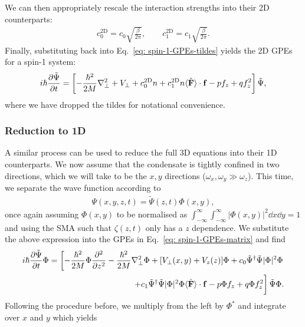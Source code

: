 We can then appropriately rescale the interaction strengths into their 2D
counterparts:
\begin{align}
    c_0^\text{2D} = c_0\sqrt{\frac{\beta}{2\pi}}, \qquad
    c_1^\text{2D} = c_1\sqrt{\frac{\beta}{2\pi}}.
\end{align}
Finally, substituting back into Eq.~\eqref{eq: spin-1-GPEs-tildes} yields the
2D GPEs for a spin-1 system:
\begin{align}
    i\hbar\pdv{\tilde{\Psi}}{t} = \left[-\frac{\hbar^2}{2M}\nabla_\perp^2 + V_\perp
    + c_0^\text{2D}n + c_1^\text{2D}n\langle\hat{\vb{F}}\rangle \cdot
    \vb{f} - pf_z + qf_z^2\right]\tilde{\Psi},
\end{align}
where we have dropped the tildes for notational convenience.

\subsubsection{Reduction to 1D}
A similar process can be used to reduce the full 3D equations into their 1D
counterparts.
We now assume that the condensate is tightly confined in two directions, which
we will take to be the \(x, y\) directions (\(\omega_x, \omega_y \gg
\omega_z\)).
This time, we separate the wave function according to
\begin{align}
    \Psi(x, y, z, t) = \tilde{\Psi}(z, t)\Phi(x, y),
\end{align}
once again assuming \(\Phi(x, y)\) to be normalised as \(\int_{-\infty}^{\infty}
\int_{-\infty}^{\infty} |\Phi(x, y)|^2 \dd x \dd y = 1\) and using the SMA such
that \(\zeta(z, t)\) only has a \(z\) dependence.
We substitute the above expression into the GPEs in
Eq.~\eqref{eq: spin-1-GPEs-matrix} and find
\begin{equation}
\begin{split}
    i\hbar\pdv{\tilde{\Psi}}{t}\Phi = \left[
        -\frac{\hbar^2}{2M}\Phi\pdv[2]{}{z}
        - \frac{\hbar^2}{2M}\nabla_\perp^2\Phi + [V_\perp(x, y) + V_z(z)]\Phi
        +c_0\tilde{\Psi}^\dagger\tilde{\Psi}|\Phi|^2\Phi\right. \\
        \left.+c_1\tilde{\Psi}^\dagger\tilde{\Psi}|\Phi|^2\Phi
        \langle\hat{\vb{F}}\rangle \cdot \vb{f}
        - p\Phi f_z + q\Phi f_z^2 \vphantom{\int_1^2}\right]\tilde{\Psi}\Phi.
\end{split}
\end{equation}
Following the procedure before, we multiply from the left by \(\Phi^*\)
and integrate over \(x\) and \(y\) which yields
